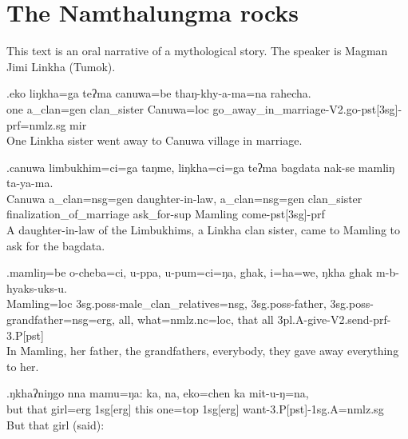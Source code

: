 

\section*{The Namthalungma rocks}\label{namthalung}

\noindent This text is an oral narrative of a mythological story. The speaker is Magman Jimi Linkha (Tumok).

\setcounter{ExNo}{0}

\exg.eko liŋkha=ga  teʔma  canuwa=be thaŋ-khy-a-ma=na      rahecha.\\
one a\_clan=gen clan\_sister Canuwa{\sc =loc} go\_away\_in\_marriage{\sc -V2.go-pst[3sg]-prf=nmlz.sg} {\sc mir}\\
One Linkha sister went away to Canuwa village in marriage.

\exg.canuwa  limbukhim=ci=ga taŋme,  liŋkha=ci=ga teʔma  bagdata  nak-se  mamliŋ ta-ya-ma.\\
Canuwa a\_clan{\sc =nsg=gen} daughter-in-law, a\_clan{\sc =nsg=gen} clan\_sister finalization\_of\_marriage ask\_for{\sc -sup} Mamling come{\sc -pst[3sg]-prf}\\
A daughter-in-law of the Limbukhims, a Linkha clan sister, came to Mamling to ask for the bagdata.

\exg.mamliŋ=be  o-cheba=ci,   u-ppa,   u-pum=ci=ŋa,   ghak, i=ha=we,   ŋkha ghak m-b-hyaks-uks-u.\\
Mamling{\sc =loc} {\sc 3sg.poss-}male\_clan\_relatives{\sc =nsg}, {\sc 3sg.poss-}father, {\sc 3sg.poss-}grandfather{\sc =nsg=erg}, all,  what{\sc =nmlz.nc=loc}, that  all  {\sc 3pl.A-}give{\sc -V2.send-prf-3.P[pst]}\\
In Mamling, her father, the grandfathers, everybody, they gave away everything to her.

\exg.ŋkhaʔniŋgo nna  mamu=ŋa: ka,  na,  eko=chen ka mit-u-ŋ=na,\\
but   that girl{\sc =erg} {\sc 1sg[erg]} this one{\sc =top}  {\sc 1sg[erg]} want{\sc -3.P[pst]-1sg.A=nmlz.sg}\\
But that girl (said): 

